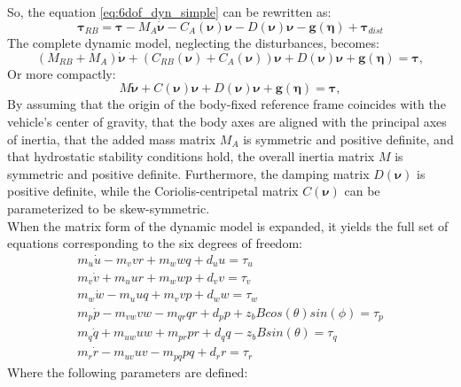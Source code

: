 So, the equation \ref{eq:6dof_dyn_simple} can be rewritten as:
\begin{equation}
    \mathbf{\tau}_{RB} = \mathbf{\tau} - M_A\dot{\mathbf{\nu}}-C_A(\mathbf{\nu})\mathbf{\nu} - D(\mathbf{\nu})\mathbf{\nu} - \mathbf{g}(\mathbf{\eta}) + \mathbf{\tau}_{dist}
    \label{eq:6dof_tau}
\end{equation}
The complete dynamic model, neglecting the disturbances, becomes:
\begin{equation}
    (M_{RB} + M_A)\dot{\mathbf{\nu}} + (C_{RB}(\mathbf{\nu}) + C_A(\mathbf{\nu}))\mathbf{\nu} + D(\mathbf{\nu})\mathbf{\nu} + \mathbf{g}(\mathbf{\eta}) = \mathbf{\tau},
\end{equation}
Or more compactly:
\begin{equation}
    M\dot{\mathbf{\nu}} + C(\mathbf{\nu})\mathbf{\nu} + D(\mathbf{\nu})\mathbf{\nu} + \mathbf{g}(\mathbf{\eta}) = \mathbf{\tau},
    \label{eq:6dof_dyn_complete}
\end{equation}
By assuming that the origin of the body-fixed reference frame coincides with the vehicle's center of gravity, that the body axes are aligned with the principal axes of inertia,
that the added mass matrix $M_A$ is symmetric and positive definite, and that hydrostatic stability conditions hold, the overall inertia matrix $M$ is symmetric and 
positive definite. Furthermore, the damping matrix $D(\mathbf{\nu})$ is positive definite, while the Coriolis-centripetal matrix $C(\mathbf{\nu})$ 
can be parameterized to be skew-symmetric.\\
When the matrix form of the dynamic model is expanded, it yields the full set of equations corresponding to the six degrees of freedom:
\begin{equation}
    \begin{split}
        m_u\dot{u} - m_vvr + m_wwq + d_uu = \tau_u \\
        m_v\dot{v} + m_uur + m_wwp + d_vv = \tau_v \\
        m_w\dot{w} - m_uuq + m_vvp + d_ww = \tau_w \\
        m_p\dot{p} - m_{vw}vw - m_{qr}qr + d_pp + z_bBcos(\theta)sin(\phi) = \tau_p \\
        m_q\dot{q} + m_{uw}uw + m_{pr}pr + d_qq - z_bBsin(\theta) = \tau_q \\
        m_r\dot{r} - m_{uv}uv - m_{pq}pq + d_rr = \tau_r
    \end{split}
    \label{eq:6dof_expanded}
\end{equation}
Where the following parameters are defined:\\

